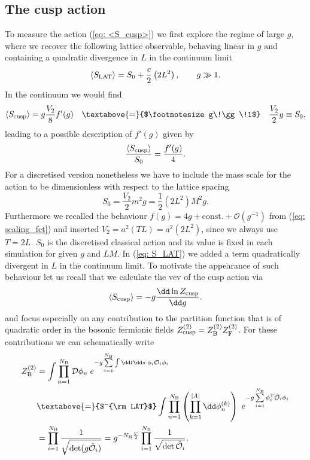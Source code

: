 \subsection{The cusp action}
To measure the action (\ref{eq: <S_cusp>}) we first explore the regime of large $g$, where we recover the following lattice observable, behaving linear in $g$ and containing a quadratic divergence in $L$ in the continuum limit
%
%
\begin{equation}
\langle S_{\rm LAT} \rangle = S_{0} + \frac{c}{2} \left(2L^{2}\right), \qquad g\gg 1.
\label{eq: S_LAT}
\end{equation}
%
%
In the continuum we would find
%
%
\begin{equation}
\langle S_{\rm cusp} \rangle = g \frac{V_{2}}{8}f'(g)  \quad \textabove{=}{$\footnotesize g\!\gg\!1$} \quad \frac{V_{2}}{2}g \equiv S_{0},
\end{equation}
%
%
leading to a possible description of $f'(g)$ given by
%
%
\begin{equation}
\frac{\langle S_{\rm cusp }\rangle}{S_{0}} = \frac{f'(g)}{4}.
\end{equation}
%
%
For a discretised version nonetheless we have to include the mass scale for the action to be dimensionless with respect to the lattice spacing
%
%
\begin{equation}
S_{0} = \frac{V_{2}}{2} m^{2}g = \frac{1}{2}\left(2L^{2}\right) M^{2} g.
\end{equation}
%
%
Furthermore we recalled the behaviour $f(g) = 4g + \text{const.} + \mathcal{O}(g^{-1})$ from (\ref{eq: scaling_fct}) and inserted $V_{2}=a^{2}(TL)=a^{2}(2L^{2})$, since we always use $T=2L$. $S_{0}$ is the discretised classical action and its value is fixed in each simulation for given $g$ and $LM$. In (\ref{eq: S_LAT}) we added a term quadratically divergent in $L$ in the continuum limit. To motivate the appearance of such behaviour let us recall that we calculate the vev of the cusp action via
%
%
\begin{equation}
 \langle S_{\rm cusp} \rangle = -g \frac{\dd \ln Z_{\rm cusp}}{\dd g}.
 \end{equation} 
and focus especially on any contribution to the partition function that is of quadratic order in the bosonic fermionic fields  $Z_{\rm cusp}^{(2)}=Z_{\rm B}^{(2)}Z_{\rm F}^{(2)}$. For these contributions we can schematically write
\begin{equation}
\begin{alignedat}{2}
Z_{\rm B}^{(2)} &= \int \prod\limits_{n=1}^{N_{\rm B}} \mathcal{D}\phi_{n} \; e^{-g \sum\limits_{i=1}^{N_{\rm B}} \int \dd t \dd s\; \phi_{i} \mathcal{O}_{i} \phi_{i}} \\
%
%
&\textabove{=}{$^{\rm LAT}$} \int \prod\limits_{n=1}^{N_{\rm B}} \left( \prod\limits_{k=1}^{\vert \mathit{\Lambda}\vert} \dd \phi_{n}^{(k)} \right) \; e^{-g \sum\limits_{i=1}^{N_{\rm B}} \phi_{i}^{\rm T}\hat{\mathcal{O}}_{i}\phi_{i}} \\
%
%
&= \prod\limits_{i=1}^{N_{\rm B}} \frac{1}{\sqrt{\det (g \hat{\mathcal{O}}_{i})}}   =    g^{-N_{\rm B}\frac{V}{2}} \prod\limits_{i=1}^{N_{\rm B}} \frac{1}{\sqrt{\det \hat{\mathcal{O}}_{i}}}  ,
\end{alignedat}
\end{equation}
